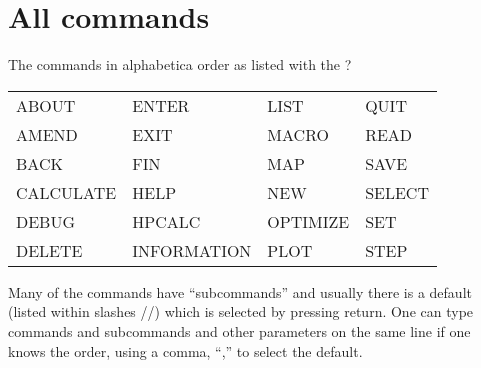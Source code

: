 \documentclass[12pt]{article}
\begin{document}
%
%

\section{All commands}

The commands in alphabetica order as listed with the ?

\begin{tabular}{llll}
ABOUT           & ENTER           & LIST           & QUIT    \\
AMEND           & EXIT            & MACRO          & READ    \\
BACK            & FIN             & MAP            & SAVE    \\
CALCULATE       & HELP            & NEW            & SELECT  \\
DEBUG           & HPCALC          & OPTIMIZE       & SET    \\
DELETE          & INFORMATION     & PLOT           & STEP     \\
\end{tabular}

Many of the commands have ``subcommands'' and usually there is a
default (listed within slashes //) which is selected by pressing
return.  One can type commands and subcommands and other parameters on
the same line if one knows the order, using a comma, ``,'' to select
the default.
\end{document}
